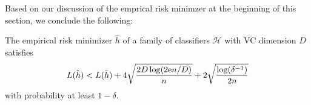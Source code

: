Based on our discussion of the emprical risk minimzer at the beginning of this section, we conclude the following:

\begin{corollary}
The empirical risk minimizer $\hat h$ of a family of classifiers $\mathcal{H}$ with VC dimension $D$ satisfies
\[
    L(\hat h) < L(\bar h) + 4 \sqrt{\frac{2D \log(2 \mathrm{e} n / D)}{n}} + 2 \sqrt{\frac{\log(\delta^{-1})}{2n}}
\]
with probability at least $1 - \delta$.
\end{corollary}
